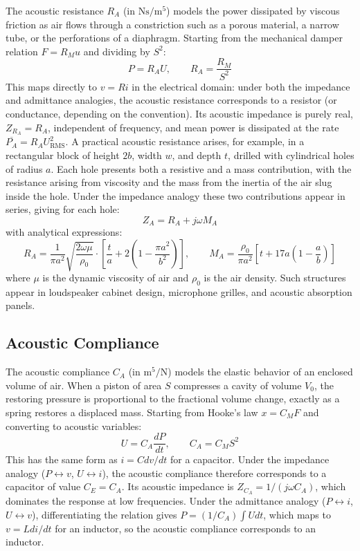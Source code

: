 The acoustic resistance \(R_A\) (in \( \si{\newton\second\per\meter\tothe{5}} \)) models the power dissipated by viscous friction as air flows through a constriction such as a porous material, a narrow tube, or the perforations of a diaphragm. Starting from the mechanical damper relation \(F = R_M u\) and dividing by \(S^2\):
\[
P = R_A U, \qquad R_A = \frac{R_M}{S^2}
\]
This maps directly to \(v = R i\) in the electrical domain: under both the impedance and admittance analogies, the acoustic resistance corresponds to a resistor (or conductance, depending on the convention). Its acoustic impedance is purely real, \(Z_{R_A} = R_A\), independent of frequency, and mean power is dissipated at the rate \(\overline{P_A} = R_A U_\mathrm{RMS}^2\).
A practical acoustic resistance arises, for example, in a rectangular block of height \(2b\), width \(w\), and depth \(t\), drilled with cylindrical holes of radius \(a\). Each hole presents both a resistive and a mass contribution, with the resistance arising from viscosity and the mass from the inertia of the air slug inside the hole. Under the impedance analogy these two contributions appear in series, giving for each hole:
\[
Z_A = R_A + j\omega M_A
\]
with analytical expressions:
\[
R_A = \frac{1}{\pi a^2}\sqrt{\frac{2\omega\mu}{\rho_0}} \cdot \left[\frac{t}{a} + 2\left(1 - \frac{\pi a^2}{b^2}\right)\right],
\qquad
M_A = \frac{\rho_0}{\pi a^2}\left[t + 17a\left(1 - \frac{a}{b}\right)\right]
\]
where \(\mu\) is the dynamic viscosity of air and \(\rho_0\) is the air density. Such structures appear in loudspeaker cabinet design, microphone grilles, and acoustic absorption panels.

\subsection{Acoustic Compliance}
\label{ssc:313}

The acoustic compliance \(C_A\) (in \(\si{\meter\tothe{5}\per\newton}\)) models the elastic behavior of an enclosed volume of air. When a piston of area \(S\) compresses a cavity of volume \(V_0\), the restoring pressure is proportional to the fractional volume change, exactly as a spring restores a displaced mass. Starting from Hooke's law \(x = C_M F\) and converting to acoustic variables:
\[
U = C_A \frac{dP}{dt}, \qquad C_A = C_M S^2
\]
This has the same form as \(i = C dv/dt\) for a capacitor. Under the impedance analogy (\(P \leftrightarrow v\), \(U \leftrightarrow i\)), the acoustic compliance therefore corresponds to a capacitor of value \(C_E = C_A\). Its acoustic impedance is \(Z_{C_A} = 1/(j\omega C_A)\), which dominates the response at low frequencies. Under the admittance analogy (\(P \leftrightarrow i\), \(U \leftrightarrow v\)), differentiating the relation gives \(P = (1/C_A)\int U dt\), which maps to \(v = L di/dt\) for an inductor, so the acoustic compliance corresponds to an inductor.

